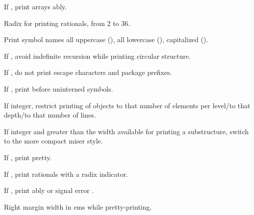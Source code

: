\begin{LIST}{1cm}
  {
    If \T, print arrays ably.
  }

  {
    Radix for printing rationals, from 2 to 36.
  }

  {
    Print symbol names all uppercase (), all lowercase
    (), capitalized ().
  }

  {
    If \T, avoid indefinite recursion while printing circular
    structure. 
  }

  {
    If \NIL, do not print escape characters and package prefixes.
  }

  {
    If \T, print \kwd{\#:} before uninterned symbols.
  }

  {
    If integer, restrict printing of objects to that number of
    elements per level/to that depth/to that number of lines.
  }

  {
    If integer and greater than the width available for printing a
    substructure, switch to the more compact miser style.
  }

  {
    If \T, print pretty.
  }

  {
    If \T, print rationals with a radix indicator.
  }

  {
    If \T, print ably or signal error
    . 
  }

  {
    Right margin width in ems while pretty-printing.
  }


\end{LIST}
